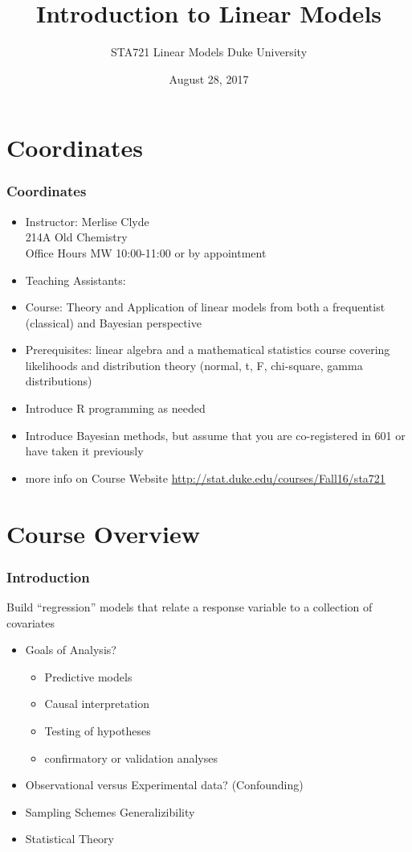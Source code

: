 \documentclass[handout]{beamer}\usepackage[]{graphicx}\usepackage[]{color}
\title{Introduction to Linear Models}
\institute{Merlise Clyde}
\author{STA721 Linear Models Duke University \\
}
\date{August 28, 2017}
\begin{document}
\maketitle
\section{Coordinates}
\begin{frame}
  \frametitle{Coordinates}
\begin{itemize}
\item Instructor: Merlise Clyde   \\ 214A Old Chemistry \\
 Office Hours MW 10:00-11:00 or  by appointment
\item Teaching Assistants:

\item Course: Theory and Application of linear models from both a
frequentist (classical) and Bayesian perspective \pause
\item Prerequisites:   linear algebra and a mathematical statistics
  course covering likelihoods and distribution theory (normal, t, F,
  chi-square, gamma distributions) \pause
\item Introduce  R programming as needed \pause
\item Introduce  Bayesian methods, but assume that you are
  co-registered in 601 or have taken it previously \pause
\item more info on Course Website
  \url{http://stat.duke.edu/courses/Fall16/sta721}
\end{itemize}
  \end{frame}

\section{Course Overview}
\begin{frame}
  \frametitle{Introduction}
  Build ``regression'' models that relate a response variable to a
  collection of covariates  \pause
  \begin{itemize}
  \item Goals of Analysis?  \pause
    \begin{itemize}
    \item Predictive models
    \item Causal interpretation
    \item Testing of hypotheses
    \item confirmatory  or validation analyses
    \end{itemize}
 \item Observational versus Experimental data? \pause (Confounding) \pause
 \item Sampling Schemes \pause  Generalizibility \pause
 \item Statistical Theory \pause
  \end{itemize}
\end{frame}
\end{document}
